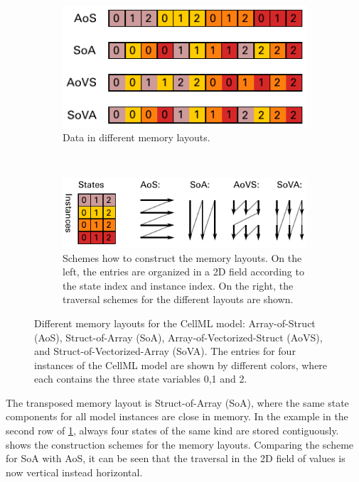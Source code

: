 \begin{figure}%
  \centering%
  \begin{subfigure}[t]{0.6\textwidth}%
    \centering%
    \includegraphics[width=\textwidth]{images/implementation/memory_layouts.pdf}
    \caption{Data in different memory layouts.}%
    \label{fig:memory_layouts}%
  \end{subfigure}\\[4mm]
  \begin{subfigure}[t]{0.7\textwidth}%
    \centering%
    \includegraphics[width=\textwidth]{images/implementation/memory_layouts1.pdf}%
    \caption{Schemes how to construct the memory layouts. On the left, the entries are organized in a 2D field according to the state index and instance index. On the right, the traversal schemes for the different layouts are shown.}%
    \label{fig:memory_layouts1}%
  \end{subfigure}
  \caption{Different memory layouts for the CellML model: Array-of-Struct (AoS), Struct-of-Array (SoA), Array-of-Vectorized-Struct (AoVS), and Struct-of-Vectorized-Array (SoVA). The entries for four instances of the CellML model are shown by different colors, where each contains the three state variables 0,1 and 2.}%
  \label{fig:memory_layouts_both}%
\end{figure}%

The transposed memory layout is Struct-of-Array (SoA), where the same state components for all model instances are close in memory. In the example in the second row of \cref{fig:memory_layouts}, always four states of the same kind are stored contiguously. 
 shows the construction schemes for the memory layouts. Comparing the scheme for SoA with AoS, it can be seen that the traversal in the 2D field of values is now vertical instead horizontal.

